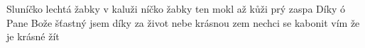 \begin{TEXT}{Sluníčko lechtá žabky v kaluži}
\SLOKA {}níčko  žabky  \NL
{} ten mokl až  kůži \NL
{}  prý   zaspa 
\SLOKA Díky ó Pane Bože šťastný jsem \NL
díky za život nebe krásnou zem \NL
nechci se kabonit vím že je krásné žít \NL
\end{TEXT}
